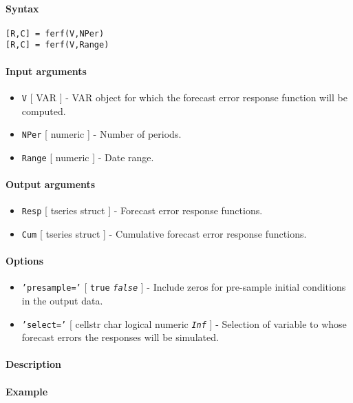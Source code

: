 


	\paragraph{Syntax}\label{syntax}

\begin{verbatim}
[R,C] = ferf(V,NPer)
[R,C] = ferf(V,Range)
\end{verbatim}

\paragraph{Input arguments}\label{input-arguments}

\begin{itemize}
\item
  \texttt{V} {[} VAR {]} - VAR object for which the forecast error
  response function will be computed.
\item
  \texttt{NPer} {[} numeric {]} - Number of periods.
\item
  \texttt{Range} {[} numeric {]} - Date range.
\end{itemize}

\paragraph{Output arguments}\label{output-arguments}

\begin{itemize}
\item
  \texttt{Resp} {[} tseries \textbar{} struct {]} - Forecast error
  response functions.
\item
  \texttt{Cum} {[} tseries \textbar{} struct {]} - Cumulative forecast
  error response functions.
\end{itemize}

\paragraph{Options}\label{options}

\begin{itemize}
\item
  \texttt{'presample='} {[} \texttt{true} \textbar{}
  \emph{\texttt{false}} {]} - Include zeros for pre-sample initial
  conditions in the output data.
\item
  \texttt{'select='} {[} cellstr \textbar{} char \textbar{} logical
  \textbar{} numeric \textbar{} \emph{\texttt{Inf}} {]} - Selection of
  variable to whose forecast errors the responses will be simulated.
\end{itemize}

\paragraph{Description}\label{description}

\paragraph{Example}\label{example}


